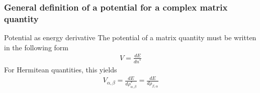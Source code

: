 \documentclass[11pt,a4paper]{report}
\begin{document}
\subsubsection{General definition of a potential for a complex matrix quantity}
\begin{myshadowminipage}{Potential as energy derivative}
The potential of a matrix quantity must be written in the following
form
\begin{eqnarray*}
V=\frac{dE}{dn^*}
\end{eqnarray*}
For Hermitean quantities, this yields 
\begin{eqnarray*}
V_{\alpha,\beta}=\frac{dE}{d\rho_{\alpha,\beta}^*}=\frac{dE}{d\rho_{\beta,\alpha}}
\end{eqnarray*}
\end{myshadowminipage}
\end{document}
